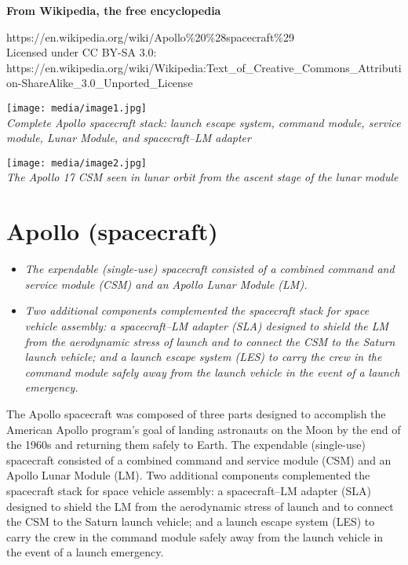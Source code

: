 \textbf{From Wikipedia, the free encyclopedia}

https://en.wikipedia.org/wiki/Apollo\%20\%28spacecraft\%29\\
Licensed under CC BY-SA 3.0:\\
https://en.wikipedia.org/wiki/Wikipedia:Text\_of\_Creative\_Commons\_Attribution-ShareAlike\_3.0\_Unported\_License

\texttt{[image: media/image1.jpg]}\\
\emph{Complete Apollo spacecraft stack: launch escape system, command
module, service module, Lunar Module, and spacecraft--LM adapter}

\texttt{[image: media/image2.jpg]}\\
\emph{The Apollo 17 CSM seen in lunar orbit from the ascent stage of the
lunar module}

\section{Apollo (spacecraft)}\label{apollo-spacecraft}

\begin{itemize}
\item
  \emph{The expendable (single-use) spacecraft consisted of a combined
  command and service module (CSM) and an Apollo Lunar Module (LM).}
\item
  \emph{Two additional components complemented the spacecraft stack for
  space vehicle assembly: a spacecraft--LM adapter (SLA) designed to
  shield the LM from the aerodynamic stress of launch and to connect the
  CSM to the Saturn launch vehicle; and a launch escape system (LES) to
  carry the crew in the command module safely away from the launch
  vehicle in the event of a launch emergency.}
\end{itemize}

The Apollo spacecraft was composed of three parts designed to accomplish
the American Apollo program's goal of landing astronauts on the Moon by
the end of the 1960s and returning them safely to Earth. The expendable
(single-use) spacecraft consisted of a combined command and service
module (CSM) and an Apollo Lunar Module (LM). Two additional components
complemented the spacecraft stack for space vehicle assembly: a
spacecraft--LM adapter (SLA) designed to shield the LM from the
aerodynamic stress of launch and to connect the CSM to the Saturn launch
vehicle; and a launch escape system (LES) to carry the crew in the
command module safely away from the launch vehicle in the event of a
launch emergency.

